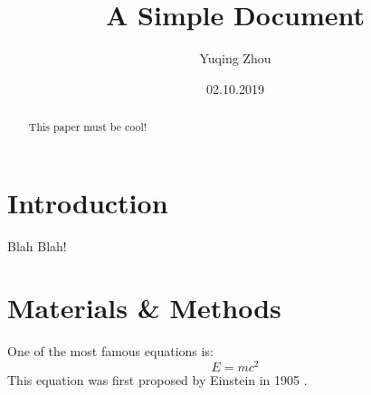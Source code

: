 \documentclass[12pt]{article}
\title{A Simple Document}
\author{Yuqing Zhou}
\date{02.10.2019}
\begin{document}
    \maketitle

    \begin{abstract}
        This paper must be cool!
    \end{abstract}

    \section{Introduction}
        Blah Blah!

    \section{Materials \& Methods}
    One of the most famous equations is:
    \begin{equation}
        E = mc^2
    \end{equation}
    This equation was first proposed by Einstein in 1905
    \cite{einstein1905does}.

    
    
\end{document}
